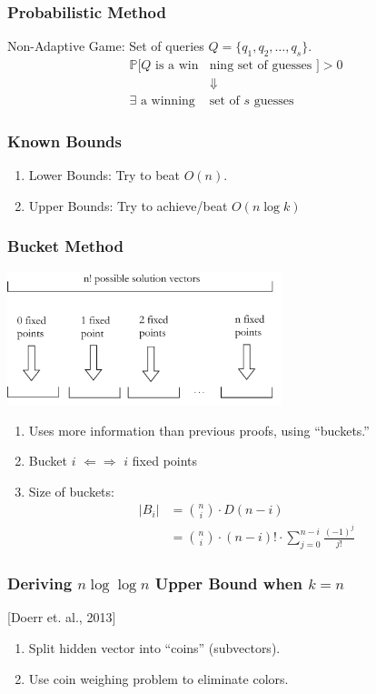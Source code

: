 \documentclass{beamer}
\begin{document}
    \begin{frame}
    \frametitle{Probabilistic Method}
    Non-Adaptive Game: Set of queries $Q=\{q_1, q_2, \ldots, q_s\}$.
    	\begin{align*}
		\mathbb{P}[Q\text{ is a win} & \text{ning set of guesses }] > 0 \\
		& \Downarrow \\
		\exists \text{ a winning } & \text{set of $s$ guesses}
		\end{align*}
    \end{frame}

    \begin{frame}
    \frametitle{Known Bounds}
	\begin{enumerate}[label=\arabic*.]
	\item Lower Bounds: Try to beat $O(n)$.
	\item Upper Bounds: Try to achieve/beat $O(n \log k)$
	\end{enumerate}
    \end{frame}
        
    \begin{frame}
    \frametitle{Bucket Method}
   		\begin{center}
		\includegraphics[keepaspectratio=true, width=0.6\textwidth]{buckets.pdf}
		\end{center}
		\begin{enumerate}[label=\roman*.]
		\item Uses more information than previous proofs, using ``buckets.''
		\item Bucket $i$ $\Leftarrow\Rightarrow$ $i$ fixed points
		\item Size of buckets:
			\begin{align*}
			|B_i| & = \binom{n}{i}\cdot D(n-i)\\
			& = \binom{n}{i} \cdot(n-i)!\cdot\sum_{j=0}^{n-i}\frac{(-1)^j}{j!}
			\end{align*}
		\end{enumerate}
    \end{frame}
    
    \begin{frame}
    \frametitle{Deriving $n\log\log n$ Upper Bound when $k=n$}
    [Doerr et. al., 2013]
    	\begin{enumerate}[label=\roman*.]
		\item Split hidden vector into ``coins'' (subvectors).
		\item Use coin weighing problem to eliminate colors.
		\end{enumerate}
    \end{frame}
    
\end{document}
